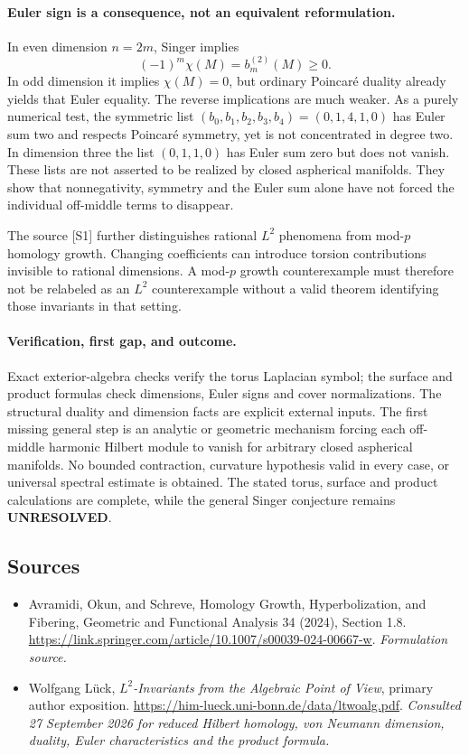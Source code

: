 \documentclass[11pt]{article}
\begin{document}
\paragraph{Euler sign is a consequence, not an equivalent reformulation.}
In even dimension $n=2m$, Singer implies
\[
                     (-1)^m\chi(M)=b_m^{(2)}(M)\ge0.
\]
In odd dimension it implies $\chi(M)=0$, but ordinary Poincar\'e
duality already yields that Euler equality. The reverse implications
are much weaker. As a purely numerical test, the symmetric list
$(b_0,b_1,b_2,b_3,b_4)=(0,1,4,1,0)$ has Euler sum two and respects
Poincar\'e symmetry, yet is not concentrated in degree two. In dimension
three the list $(0,1,1,0)$ has Euler sum zero but does not vanish.
These lists are not asserted to be realized by closed aspherical
manifolds. They show that nonnegativity, symmetry and the Euler sum
alone have not forced the individual off-middle terms to disappear.

The source [S1] further distinguishes rational $L^2$ phenomena from
mod-$p$ homology growth. Changing coefficients can introduce torsion
contributions invisible to rational dimensions. A mod-$p$ growth
counterexample must therefore not be relabeled as an $L^2$ counterexample
without a valid theorem identifying those invariants in that setting.

\paragraph{Verification, first gap, and outcome.}
Exact exterior-algebra checks verify the torus Laplacian symbol; the
surface and product formulas check dimensions, Euler signs and cover
normalizations. The structural duality and dimension facts are explicit
external inputs. The first missing general step is an analytic or
geometric mechanism forcing each off-middle harmonic Hilbert module
to vanish for arbitrary closed aspherical manifolds. No bounded
contraction, curvature hypothesis valid in every case, or universal
spectral estimate is obtained. The stated torus, surface and product
calculations are complete, while the general Singer conjecture remains
\textbf{UNRESOLVED}.

\subsection{Sources}
\begin{itemize}
\item[S1]Avramidi, Okun, and Schreve, Homology Growth, Hyperbolization, and Fibering, Geometric and Functional Analysis 34 (2024), Section 1.8.
\url{https://link.springer.com/article/10.1007/s00039-024-00667-w}.
\textit{Formulation source.}
\item[E1]Wolfgang L\"uck, \emph{$L^2$-Invariants from the Algebraic Point of View}, primary author exposition.
\url{https://him-lueck.uni-bonn.de/data/ltwoalg.pdf}.
\textit{Consulted 27 September 2026 for reduced Hilbert homology, von Neumann dimension, duality, Euler characteristics and the product formula.}
\end{itemize}
\end{document}
